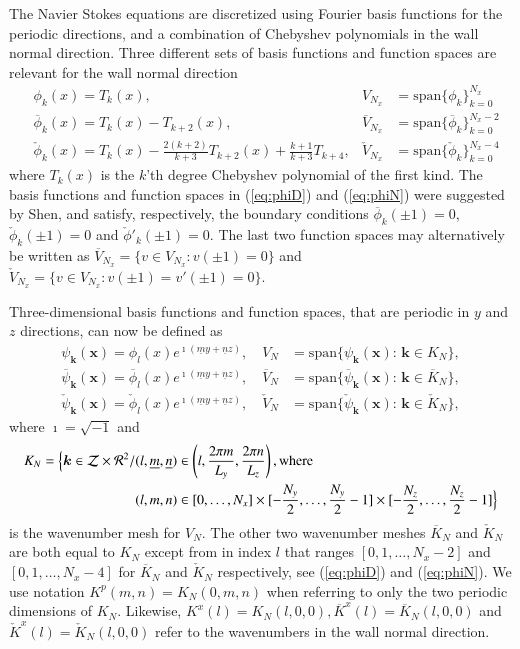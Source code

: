 \documentclass[11pt, oneside]{elsarticle}
\newcommand{\N}[1]{\check{#1}}
\newcommand{\D}[1]{\overline{#1}}
\begin{document}
The Navier Stokes equations are discretized using Fourier basis functions for the periodic directions, and a combination of Chebyshev polynomials in the wall normal direction. Three different sets of basis functions and function spaces are relevant for the wall normal direction
\begin{align}
&  \phi_k(x) = T_k(x), & V_{N_x} &= \text{span}\{\phi_k\}_{k=0}^{N_x} \label{eq:Tk}\\
& \D{\phi}_k(x) = T_k(x) - T_{k+2}(x), & \D{V}_{N_x} &= \text{span} \{ \D{\phi}_k\}_{k=0}^{N_x-2} \label{eq:phiD}\\
& \N{\phi}_k(x) = T_k(x) - \frac{2(k+2)}{k+3} T_{k+2}(x) + 
\frac{k+1}{k+3} T_{k+4}, & \N{V}_{N_x} &= \text{span} \{\N{\phi}_k\}_{k=0}^{N_x-4} \label{eq:phiN} 
\end{align}
where $T_k(x)$ is the $k$'th degree Chebyshev polynomial of the first kind. The 
basis functions and function spaces in (\ref{eq:phiD}) and (\ref{eq:phiN}) were 
suggested by Shen, and satisfy, respectively, the boundary conditions 
$\D{\phi}_k(\pm 1) = 0$, $\N{\phi}_k(\pm 1)=0$ and $\N{\phi}'_k(\pm 1)=0$. The 
last two function spaces may alternatively be written as $\D{V}_{N_x} = \{v \in 
V_{N_x}: v(\pm 1)=0 \}$ and $\N{V}_{N_x} = \{v \in V_{N_x}: v(\pm 1) = v'(\pm 
1) = 0 \}$.  

Three-dimensional basis functions and function spaces, that are periodic in $y$ 
and $z$ directions, can now be defined as
\begin{align}
  \psi_{\bm{k}}(\bm{x}) = \phi_{l}(x)e^{ \imath(\underline{m} y + \underline{n} z)}, \quad V_N &= \text{span} \{ \psi_{\bm{k}}(\bm{x}):\, \bm{k} \in K_N  \}, \\
  \D{\psi}_{\bm{k}}(\bm{x}) = \D{\phi}_{l}(x)e^{ \imath(\underline{m} y + \underline{n} z)}, \quad \D{V}_N &= \text{span} \{ \D{\psi}_{\bm{k}}(\bm{x}):\, \bm{k} \in \D{K}_N  \}, \\
  \N{\psi}_{\bm{k}}(\bm{x}) = \N{\phi}_{l}(x)e^{ \imath(\underline{m} y + \underline{n} z)}, \quad \N{V}_N &= \text{span} \{ \N{\psi}_{\bm{k}}(\bm{x}):\, \bm{k} \in \N{K}_N  \},
\end{align}
where $\imath=\sqrt{-1}$ and 
\begin{align}
K_N = \Big\{\bm{k} \in \mathcal{Z}\times\mathcal{R}^2 / &(l, \underline{m}, \underline{n}) \in \left( l, \frac{2 \pi m}{L_y}, \frac{2 \pi n}{L_z} \right), \text{where} \notag \\
 &(l, m, n) \in  [0, \ldots, N_x] \times [-\frac{N_y}{2},\ldots, 
 \frac{N_y}{2}-1] \times[-\frac{N_z}{2},\ldots, \frac{N_z}{2}-1] \Big\} 
 \label{eq:wavenumbermesh}
\end{align}
is the wavenumber mesh for $V_N$. The other two wavenumber meshes $\D{K}_N$ and 
$\N{K}_N$ are both equal to $K_N$ except from in index $l$ that 
ranges $[0, 1, \ldots, N_x-2]$ and $[0, 1, \ldots, N_x-4]$ for $\D{K}_N$ 
and $\N{K}_N$ respectively, see (\ref{eq:phiD}) and (\ref{eq:phiN}). We use 
notation $K^p(m, n)=K_N(0, m, n)$ when referring to only the two periodic 
dimensions of $K_N$. Likewise, ${K}^x(l)={K}_N(l, 0, 0), \D{K}^x(l)=\D{K}_N(l, 0, 0)$ and $\N{K}^x(l)=\N{K}_N(l, 0, 0)$ refer to the wavenumbers in the wall normal direction.
\end{document}
